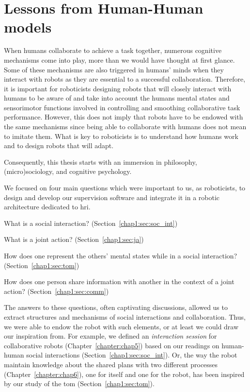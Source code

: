 \documentclass[a4paper,11pt,twoside]{StyleThese}
\begin{document}
	\setcounter{chapter}{0} %
	\dominitoc
	\faketableofcontents
	\fi


\chapter{Lessons from Human-Human models}
\label{chapter:chap1}
\minitoc

When humans collaborate to achieve a task together, numerous cognitive mechanisms come into play, more than we would have thought at first glance. Some of these mechanisms are also triggered in humans’ minds when they interact with robots as they are essential to a successful collaboration. Therefore, it is important for roboticists designing robots that will closely interact with humans to be aware of and take into account the humans mental states and sensorimotor functions involved in controlling and smoothing collaborative task performance.  However, this does not imply that robots have to be endowed with the same mechanisms since being able to collaborate with humans does not mean to imitate them. What is key to roboticists is to understand how humans work and to design robots that will adapt. 

Consequently, this thesis starts with an immersion in philosophy, (micro)sociology, and cognitive psychology. 

\newpage

We focused on four main questions which were important to us, as roboticists, to design and develop our supervision software and integrate it in a robotic architecture dedicated to \acrshort{hri}. 

\begin{bulletList}
	\item What is a social interaction? (Section~\ref{chap1:sec:soc_int})
	\item What is a joint action? (Section~\ref{chap1:sec:ja})
	\item How does one represent the others' mental states while in a social interaction? (Section~\ref{chap1:sec:tom})
	\item How does one person share information with another in the context of a joint action? (Section~\ref{chap1:sec:comm})
\end{bulletList}

The answers to these questions, often captivating discussions, allowed us to extract structures and mechanisms of social interactions and collaboration. Thus, we were able to endow the robot with such elements, or at least we could draw our inspiration from. For example, we defined an \emph{interaction session} for collaborative robots (Chapter~\ref{chapter:chap5}) based on our readings on human-human social interactions (Section~\ref{chap1:sec:soc_int}). Or, the way the robot maintain knowledge about the shared plans with two different processes (Chapter~\ref{chapter:chap6}), one for itself and one for the robot, has been inspired by our study of the \acrlong{tom} (Section~\ref{chap1:sec:tom}).
\end{document}
